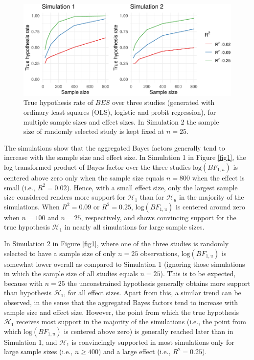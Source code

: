 \documentclass[]{interact}
\theoremstyle{plain}%
\theoremstyle{definition}
\theoremstyle{remark}
\begin{document}
\begin{figure}
\includegraphics[width=1\linewidth]{research_report_volker_files/figure-latex/unnamed-chunk-2-1} \caption{\label{fig2}True hypothesis rate of $BES$ over three studies (generated with ordinary least squares (OLS), logistic and probit regression), for multiple sample sizes and effect sizes. In Simulation 2 the sample size of randomly selected study is kept fixed at $n = 25$.}\label{fig:unnamed-chunk-2}
\end{figure}

The simulations show that the aggregated Bayes factors generally tend to
increase with the sample size and effect size. In Simulation 1 in Figure
\ref{fig1}, the log-transformed product of Bayes factor over the three
studies \(\text{log}(BF_{1,u})\) is centered above zero only when the
sample size equals \(n = 800\) when the effect is small (i.e.,
\(R^2 = 0.02\)). Hence, with a small effect size, only the largest
sample size considered renders more support for \(\mathcal{H}_1\) than
for \(\mathcal{H}_u\) in the majority of the simulations. When
\(R^2 = 0.09\) or \(R^2 = 0.25\), \(\text{log}(BF_{1,u})\) is centered
around zero when \(n = 100\) and \(n = 25\), respectively, and shows
convincing support for the true hypothesis \(\mathcal{H}_1\) in nearly
all simulations for large sample sizes.

In Simulation 2 in Figure \ref{fig1}, where one of the three studies is
randomly selected to have a sample size of only \(n = 25\) observations,
\(\text{log}(BF_{1,u})\) is somewhat lower overall as compared to
Simulation 1 (ignoring those simulations in which the sample size of all
studies equals \(n = 25\)). This is to be expected, because with
\(n = 25\) the unconstrained hypothesis generally obtains more support
than hypothesis \(\mathcal{H}_1\), for all effect sizes. Apart from
this, a similar trend can be observed, in the sense that the aggregated
Bayes factors tend to increase with sample size and effect size.
However, the point from which the true hypothesis \(\mathcal{H}_1\)
receives most support in the majority of the simulations (i.e., the
point from which \(\text{log}(BF_{1,u})\) is centered above zero) is
generally reached later than in Simulation 1, and \(\mathcal{H}_1\) is
convincingly supported in most simulations only for large sample sizes
(i.e., \(n \geq 400\)) and a large effect (i.e., \(R^2 = 0.25\)).
\end{document}
